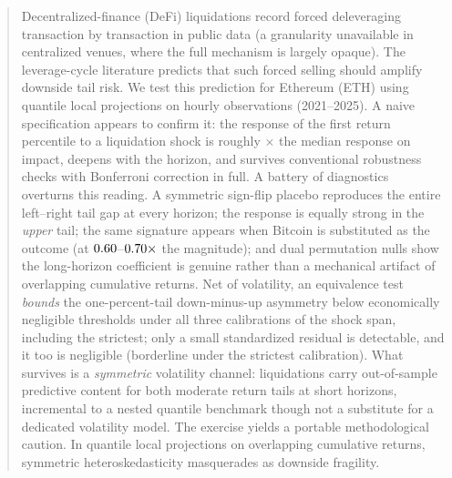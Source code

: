 \begin{abstract}
\noindent
Decentralized-finance (DeFi) liquidations record forced deleveraging
transaction by transaction in public data (a granularity unavailable in
centralized venues, where the full mechanism is largely opaque).
The leverage-cycle literature predicts that such forced selling should
amplify downside tail risk. We test this prediction for Ethereum (ETH)
using quantile local projections on \Nobs{} hourly observations (2021--2025).
A naive specification appears to confirm it: the response of the first return
percentile to a liquidation shock is roughly \RatioTailMedImpact$\times$ the
median response on impact, deepens with the horizon, and survives
conventional robustness checks with Bonferroni correction in full. A battery of
diagnostics overturns this reading. A symmetric sign-flip placebo reproduces
the entire left--right tail gap at every horizon; the response is equally
strong in the \emph{upper} tail; the same signature appears when Bitcoin is
substituted as the outcome (at $\BtcOverEthHtwelve$--$\BtcOverEthHzero\times$ the magnitude); and dual
permutation nulls show the long-horizon coefficient is genuine rather than a
mechanical artifact of overlapping cumulative returns. Net of volatility, an
equivalence test \emph{bounds} the one-percent-tail down-minus-up asymmetry below economically negligible thresholds under all three calibrations of the shock span, including the strictest; only a small standardized residual is detectable, and it too is negligible (borderline under the strictest calibration). What survives is a
\emph{symmetric} volatility channel: liquidations carry out-of-sample
predictive content for both moderate return tails at short horizons, incremental to a
nested quantile benchmark though not a substitute for a dedicated volatility
model.
The exercise yields a portable methodological caution. In quantile local
projections on overlapping cumulative returns, symmetric heteroskedasticity
masquerades as downside fragility.
\end{abstract}